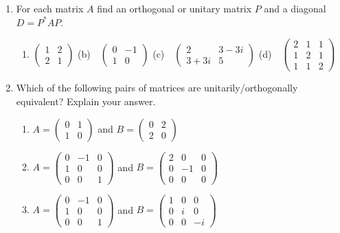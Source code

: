 \begin{exercises}
\begin{enumerate}[label=\thesubsection.\arabic*., align=right]
  \item\label{ex:orthequiv1} For each matrix $A$ find an orthogonal or unitary matrix $P$ and a diagonal $D=P^*AP$.
  \begin{enumerate}
    \item $\begin{pmatrix}
    1&2\\2&1
    \end{pmatrix}$
    \qquad
    (b)\ \ $\begin{pmatrix}
    0&-1\\1&0
    \end{pmatrix}$
    \qquad
    (c)\ \ $\begin{pmatrix}
    2&3-3i\\3+3i&5
    \end{pmatrix}$
    \qquad
    (d)\ \ $\begin{pmatrix}
    2&1&1\\1&2&1\\1&1&2
    \end{pmatrix}$
  \end{enumerate}
  
  \item Which of the following pairs of matrices are unitarily/orthogonally equivalent? Explain your answer.
  \begin{enumerate}
    \item $A=\begin{pmatrix}
    0&1\\1&0
    \end{pmatrix}$ and $B=\begin{pmatrix}
    0&2\\2&0
    \end{pmatrix}$
    \item $A=\begin{pmatrix}
    0&-1&0\\1&0&0\\0&0&1
    \end{pmatrix}$ and $B=\begin{pmatrix}
    2&0&0\\0&-1&0\\0&0&0
    \end{pmatrix}$
    \item $A=\begin{pmatrix}
    0&-1&0\\1&0&0\\0&0&1
    \end{pmatrix}$ and $B=\begin{pmatrix}
    1&0&0\\0&i&0\\0&0&-i
    \end{pmatrix}$
  \end{enumerate}
	

\end{enumerate}
\end{exercises}
